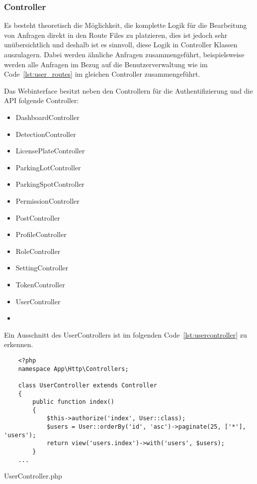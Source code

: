 \subsubsection{Controller}
Es besteht theoretisch die Möglichkeit, die komplette Logik für die Bearbeitung
von Anfragen direkt in den Route Files zu platzieren, dies ist jedoch sehr
unübersichtlich und deshalb ist es sinnvoll, diese Logik in Controller Klassen
auszulagern. Dabei werden ähnliche Anfragen zusammengeführt, beispielsweise werden
alle Anfragen im Bezug auf die Benutzerverwaltung wie im Code~\ref{lst:user_routes} im gleichen Controller
zusammengeführt.

Das Webinterface besitzt neben den Controllern für die Authentifizierung und die
API folgende Controller:

\begin{multicols}{2}
  \begin{itemize}
    \item DashboardController  \item DetectionController \item LicensePlateController \item ParkingLotController
    \item ParkingSpotController \item PermissionController \item PostController \item ProfileController
    \item RoleController \item SettingController \item TokenController \item UserController \item[\vspace{\fill}]
  \end{itemize}
\end{multicols}

Ein Ausschnitt des UserControllers ist im folgenden
Code~\ref{lst:usercontroller} zu erkennen.

\begin{listing}[H]
  \begin{verbatim}
    <?php
    namespace App\Http\Controllers;

    class UserController extends Controller
    {
        public function index()
        {
            $this->authorize('index', User::class);
            $users = User::orderBy('id', 'asc')->paginate(25, ['*'], 'users');
            return view('users.index')->with('users', $users);
        }
    ...
  \end{verbatim}
  \caption{UserController.php}
  \label{lst:usercontroller}
\end{listing}

